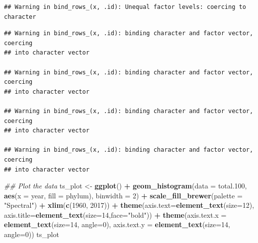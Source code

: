 \documentclass[12pt,]{article}
\newenvironment{Shaded}{\begin{snugshade}}{\end{snugshade}}
\newcommand{\CommentTok}[1]{\textcolor[rgb]{0.56,0.35,0.01}{\textit{#1}}}
\newcommand{\DataTypeTok}[1]{\textcolor[rgb]{0.13,0.29,0.53}{#1}}
\newcommand{\DecValTok}[1]{\textcolor[rgb]{0.00,0.00,0.81}{#1}}
\newcommand{\FloatTok}[1]{\textcolor[rgb]{0.00,0.00,0.81}{#1}}
\newcommand{\KeywordTok}[1]{\textcolor[rgb]{0.13,0.29,0.53}{\textbf{#1}}}
\newcommand{\NormalTok}[1]{#1}
\newcommand{\OperatorTok}[1]{\textcolor[rgb]{0.81,0.36,0.00}{\textbf{#1}}}
\newcommand{\StringTok}[1]{\textcolor[rgb]{0.31,0.60,0.02}{#1}}
\begin{document}
\begin{verbatim}
## Warning in bind_rows_(x, .id): Unequal factor levels: coercing to character
\end{verbatim}

\begin{verbatim}
## Warning in bind_rows_(x, .id): binding character and factor vector, coercing
## into character vector

## Warning in bind_rows_(x, .id): binding character and factor vector, coercing
## into character vector

## Warning in bind_rows_(x, .id): binding character and factor vector, coercing
## into character vector

## Warning in bind_rows_(x, .id): binding character and factor vector, coercing
## into character vector
\end{verbatim}

\begin{Shaded}
\begin{Highlighting}[]
\CommentTok{## Plot the data}
\NormalTok{ts_plot <-}\StringTok{ }\KeywordTok{ggplot}\NormalTok{() }\OperatorTok{+}
\StringTok{  }\KeywordTok{geom_histogram}\NormalTok{(}\DataTypeTok{data =}\NormalTok{ total}\FloatTok{.100}\NormalTok{, }\KeywordTok{aes}\NormalTok{(}\DataTypeTok{x =}\NormalTok{ year, }\DataTypeTok{fill =}\NormalTok{ phylum), }\DataTypeTok{binwidth =} \DecValTok{2}\NormalTok{) }\OperatorTok{+}\StringTok{ }
\StringTok{  }\KeywordTok{scale_fill_brewer}\NormalTok{(}\DataTypeTok{palette =} \StringTok{"Spectral"}\NormalTok{) }\OperatorTok{+}\StringTok{ }
\StringTok{  }\KeywordTok{xlim}\NormalTok{(}\KeywordTok{c}\NormalTok{(}\DecValTok{1960}\NormalTok{, }\DecValTok{2017}\NormalTok{)) }\OperatorTok{+}\StringTok{ }
\StringTok{  }\KeywordTok{theme}\NormalTok{(}\DataTypeTok{axis.text=}\KeywordTok{element_text}\NormalTok{(}\DataTypeTok{size=}\DecValTok{12}\NormalTok{),}
        \DataTypeTok{axis.title=}\KeywordTok{element_text}\NormalTok{(}\DataTypeTok{size=}\DecValTok{14}\NormalTok{,}\DataTypeTok{face=}\StringTok{"bold"}\NormalTok{)) }\OperatorTok{+}
\StringTok{  }\KeywordTok{theme}\NormalTok{(}\DataTypeTok{axis.text.x =} \KeywordTok{element_text}\NormalTok{(}\DataTypeTok{size=}\DecValTok{14}\NormalTok{, }\DataTypeTok{angle=}\DecValTok{0}\NormalTok{), }
        \DataTypeTok{axis.text.y =} \KeywordTok{element_text}\NormalTok{(}\DataTypeTok{size=}\DecValTok{14}\NormalTok{, }\DataTypeTok{angle=}\DecValTok{0}\NormalTok{))}
\NormalTok{ts_plot}
\end{Highlighting}
\end{Shaded}
\end{document}
